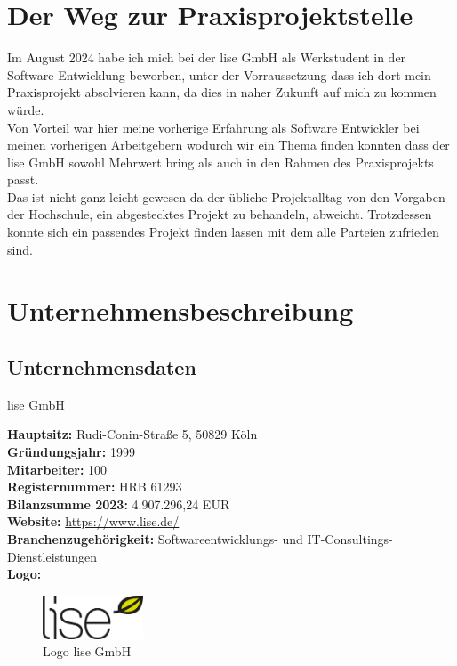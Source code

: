 \chapter{Der Weg zur Praxisprojektstelle}\label{ch:weg_zur_pp}
Im August 2024 habe ich mich bei der lise GmbH als Werkstudent in der Software Entwicklung beworben, unter der Vorraussetzung dass ich dort
mein Praxisprojekt absolvieren kann, da dies in naher Zukunft auf mich zu kommen würde.\\
Von Vorteil war hier meine vorherige Erfahrung als Software Entwickler bei meinen vorherigen Arbeitgebern wodurch wir ein
Thema finden konnten dass der lise GmbH sowohl Mehrwert bring als auch in den Rahmen des Praxisprojekts passt.\\
Das ist nicht ganz leicht gewesen da der übliche Projektalltag von den Vorgaben der Hochschule, ein abgestecktes Projekt zu behandeln, abweicht.
Trotzdessen konnte sich ein passendes Projekt finden lassen mit dem alle Parteien zufrieden sind.

\chapter{Unternehmensbeschreibung}\label{ch:unternehmen}
\section{Unternehmensdaten}\label{sec:nternehmensdaten}
lise GmbH

\textbf{Hauptsitz:} Rudi-Conin-Straße 5, 50829 Köln\\
\textbf{Gründungsjahr:} 1999\\
\textbf{Mitarbeiter: } 100\\
\textbf{Registernummer: } HRB 61293\\
\textbf{Bilanzsumme 2023: } 4.907.296,24 EUR \autocite{unternehmensregister2024}\\
\textbf{Website:} \url{https://www.lise.de/}\\
\textbf{Branchenzugehörigkeit:} Softwareentwicklungs- und IT-Consultings-Dienstleistungen\\
\textbf{Logo:}
\begin{figure}[H]
    \begin{center}
        \includegraphics[width=3cm]{bilder/lise_logo_web.png}
        \caption{Logo lise GmbH}\label{fig:lise}
    \end{center}
\end{figure}

